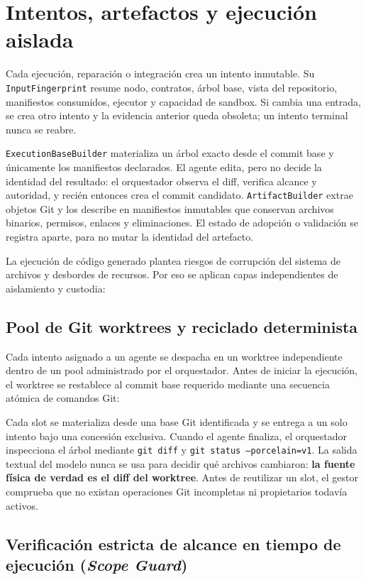 \section{Intentos, artefactos y ejecución aislada}
\label{sec:workers-aislados}

Cada ejecución, reparación o integración crea un intento inmutable. Su
\texttt{InputFingerprint} resume nodo, contratos, árbol base, vista del
repositorio, manifiestos consumidos, ejecutor y capacidad de sandbox. Si cambia
una entrada, se crea otro intento y la evidencia anterior queda obsoleta; un
intento terminal nunca se reabre.

\texttt{ExecutionBaseBuilder} materializa un árbol exacto desde el commit base
y únicamente los manifiestos declarados. El agente edita, pero no decide la
identidad del resultado: el orquestador observa el diff, verifica alcance y
autoridad, y recién entonces crea el commit candidato. \texttt{ArtifactBuilder}
extrae objetos Git y los describe en manifiestos inmutables que conservan
archivos binarios, permisos, enlaces y eliminaciones. El estado de adopción o
validación se registra aparte, para no mutar la identidad del artefacto.

La ejecución de código generado plantea riesgos de corrupción del sistema de
archivos y desbordes de recursos. Por eso se aplican capas independientes de
aislamiento y custodia:

\subsection{Pool de Git worktrees y reciclado determinista}

Cada intento asignado a un agente se despacha en un worktree independiente dentro de un pool administrado por el orquestador. Antes de iniciar la ejecución, el worktree se restablece al commit base requerido mediante una secuencia atómica de comandos Git:

Cada slot se materializa desde una base Git identificada y se entrega a un solo
intento bajo una concesión exclusiva. Cuando el agente finaliza, el orquestador
inspecciona el árbol mediante \texttt{git diff} y
\texttt{git status --porcelain=v1}. La salida textual del modelo nunca se usa
para decidir qué archivos cambiaron: \textbf{la fuente física de verdad es el
diff del worktree}. Antes de reutilizar un slot, el gestor comprueba que no
existan operaciones Git incompletas ni propietarios todavía activos.

\subsection{Verificación estricta de alcance en tiempo de ejecución (\emph{Scope Guard})}

